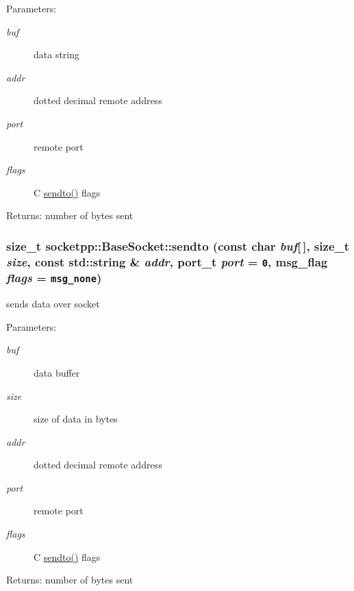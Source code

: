 \begin{CompactItemize}
\begin{Desc}
\item[Parameters:]
\begin{description}
\item[{\em buf}]data string \item[{\em addr}]dotted decimal remote address \item[{\em port}]remote port \item[{\em flags}]C \hyperlink{classsocketpp_1_1BaseSocket_d6df36281c6fce81e5c4c493ac91a6f8}{sendto()} flags \end{description}
\end{Desc}
\begin{Desc}
\item[Returns:]number of bytes sent \end{Desc}
\hypertarget{classsocketpp_1_1BaseSocket_33e5d93278884480c62a1586a2a4a114}{
\subsubsection[{sendto}]{\setlength{\rightskip}{0pt plus 5cm}size\_\-t socketpp::BaseSocket::sendto (const char {\em buf}\mbox{[}$\,$\mbox{]}, \/  size\_\-t {\em size}, \/  const std::string \& {\em addr}, \/  port\_\-t {\em port} = {\tt 0}, \/  msg\_\-flag {\em flags} = {\tt msg\_\-none})}}
\label{classsocketpp_1_1BaseSocket_33e5d93278884480c62a1586a2a4a114}


sends data over socket 

\begin{Desc}
\item[Parameters:]
\begin{description}
\item[{\em buf}]data buffer \item[{\em size}]size of data in bytes \item[{\em addr}]dotted decimal remote address \item[{\em port}]remote port \item[{\em flags}]C \hyperlink{classsocketpp_1_1BaseSocket_d6df36281c6fce81e5c4c493ac91a6f8}{sendto()} flags \end{description}
\end{Desc}
\begin{Desc}
\item[Returns:]number of bytes sent \end{Desc}
\hypertarget{classsocketpp_1_1BaseSocket_5a2b11a5b30d54cc303f480eeb5642b1}{
}
\end{CompactItemize}
